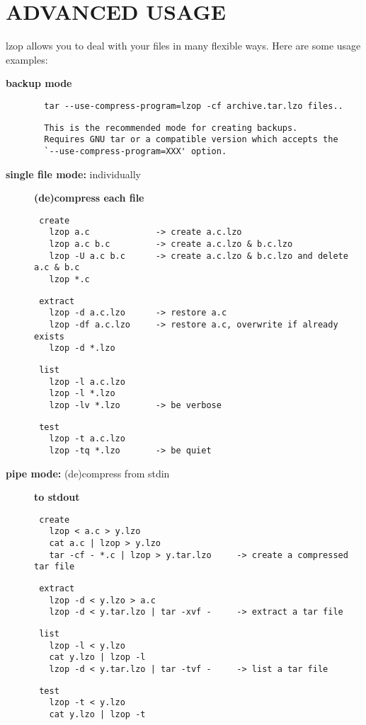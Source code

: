 \section{ADVANCED USAGE\label{ADVANCED_USAGE}}


lzop allows you to deal with your files in many flexible
ways. Here are some usage examples:

\begin{description}

\item[\textbf{backup mode}] \mbox{}\begin{verbatim}
  tar --use-compress-program=lzop -cf archive.tar.lzo files..
\end{verbatim}
\begin{verbatim}
  This is the recommended mode for creating backups.
  Requires GNU tar or a compatible version which accepts the
  `--use-compress-program=XXX' option.
\end{verbatim}

\item[\textbf{single file mode:} individually] \textbf{(de)compress each file}\begin{verbatim}
 create
   lzop a.c             -> create a.c.lzo
   lzop a.c b.c         -> create a.c.lzo & b.c.lzo
   lzop -U a.c b.c      -> create a.c.lzo & b.c.lzo and delete a.c & b.c
   lzop *.c
\end{verbatim}
\begin{verbatim}
 extract
   lzop -d a.c.lzo      -> restore a.c
   lzop -df a.c.lzo     -> restore a.c, overwrite if already exists
   lzop -d *.lzo
\end{verbatim}
\begin{verbatim}
 list
   lzop -l a.c.lzo
   lzop -l *.lzo
   lzop -lv *.lzo       -> be verbose
\end{verbatim}
\begin{verbatim}
 test
   lzop -t a.c.lzo
   lzop -tq *.lzo       -> be quiet
\end{verbatim}

\item[\textbf{pipe mode:} (de)compress from stdin] \textbf{to stdout}\begin{verbatim}
 create
   lzop < a.c > y.lzo
   cat a.c | lzop > y.lzo
   tar -cf - *.c | lzop > y.tar.lzo     -> create a compressed tar file
\end{verbatim}
\begin{verbatim}
 extract
   lzop -d < y.lzo > a.c
   lzop -d < y.tar.lzo | tar -xvf -     -> extract a tar file
\end{verbatim}
\begin{verbatim}
 list
   lzop -l < y.lzo
   cat y.lzo | lzop -l
   lzop -d < y.tar.lzo | tar -tvf -     -> list a tar file
\end{verbatim}
\begin{verbatim}
 test
   lzop -t < y.lzo
   cat y.lzo | lzop -t
\end{verbatim}


\end{description}
